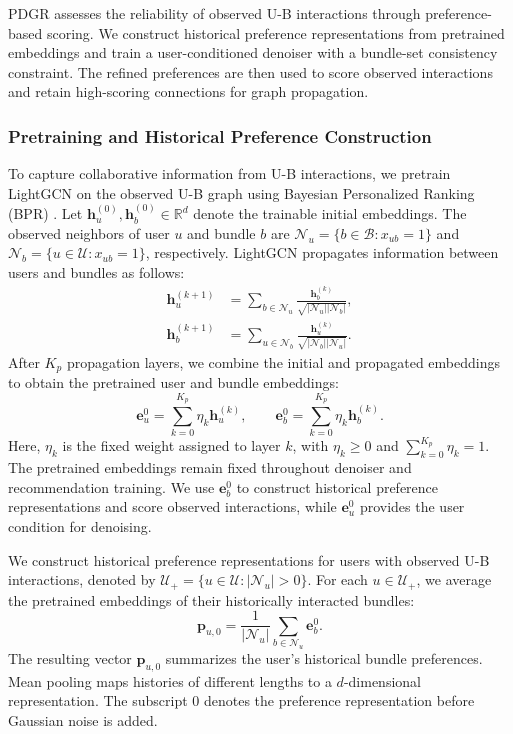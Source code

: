 \documentclass[letterpaper]{article}
\begin{document}
PDGR assesses the reliability of observed U-B interactions through preference-based scoring. We construct historical preference representations from pretrained embeddings and train a user-conditioned denoiser with a bundle-set consistency constraint. The refined preferences are then used to score observed interactions and retain high-scoring connections for graph propagation.

\subsubsection{Pretraining and Historical Preference Construction}

To capture collaborative information from U-B interactions, we pretrain LightGCN \cite{he2020lightgcn} on the observed U-B graph using Bayesian Personalized Ranking (BPR) \cite{rendle2009bpr}. Let $\mathbf h_u^{(0)},\mathbf h_b^{(0)}\in\mathbb R^d$ denote the trainable initial embeddings. The observed neighbors of user $u$ and bundle $b$ are $\mathcal N_u=\{b\in\mathcal B:x_{ub}=1\}$ and $\mathcal N_b=\{u\in\mathcal U:x_{ub}=1\}$, respectively. LightGCN propagates information between users and bundles as follows:
\begin{equation}
\begin{aligned}
\mathbf h_u^{(k+1)}
&=\sum_{b\in\mathcal N_u}
\frac{\mathbf h_b^{(k)}}
{\sqrt{|\mathcal N_u||\mathcal N_b|}},\\
\mathbf h_b^{(k+1)}
&=\sum_{u\in\mathcal N_b}
\frac{\mathbf h_u^{(k)}}
{\sqrt{|\mathcal N_b||\mathcal N_u|}}.
\end{aligned}
\tag{1}
\end{equation}
After $K_p$ propagation layers, we combine the initial and propagated embeddings to obtain the pretrained user and bundle embeddings:
\begin{equation}
\mathbf e_u^0=\sum_{k=0}^{K_p}\eta_k\mathbf h_u^{(k)},
\qquad
\mathbf e_b^0=\sum_{k=0}^{K_p}\eta_k\mathbf h_b^{(k)}.
\tag{2}
\end{equation}
Here, $\eta_k$ is the fixed weight assigned to layer $k$, with $\eta_k\geq0$ and $\sum_{k=0}^{K_p}\eta_k=1$.
The pretrained embeddings remain fixed throughout denoiser and recommendation training. We use $\mathbf e_b^0$ to construct historical preference representations and score observed interactions, while $\mathbf e_u^0$ provides the user condition for denoising.

We construct historical preference representations for users with observed U-B interactions, denoted by $\mathcal U_+=\{u\in\mathcal U:|\mathcal N_u|>0\}$. For each $u\in\mathcal U_+$, we average the pretrained embeddings of their historically interacted bundles:
\begin{equation}
\mathbf p_{u,0}
=\frac{1}{|\mathcal N_u|}
\sum_{b\in\mathcal N_u}\mathbf e_b^0.
\tag{3}
\end{equation}
The resulting vector $\mathbf p_{u,0}$ summarizes the user's historical bundle preferences. Mean pooling maps histories of different lengths to a $d$-dimensional representation. The subscript $0$ denotes the preference representation before Gaussian noise is added.
\end{document}
